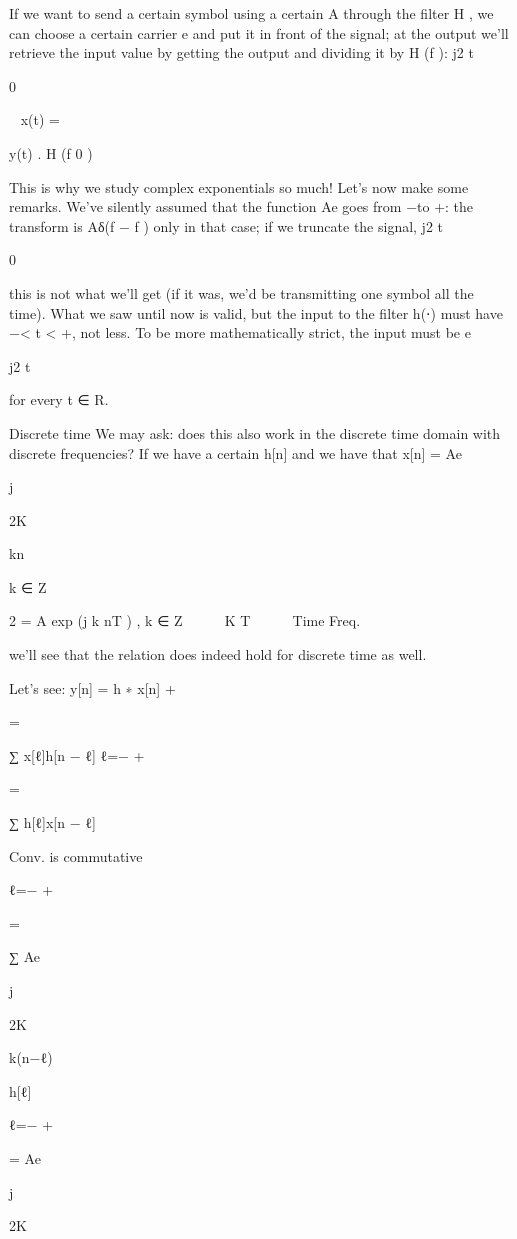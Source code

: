 {If we want to send a certain symbol using a certain A through the filter H , we can choose a certain carrier e and put it in front of the signal; at the output we'll retrieve the input value by getting the output and dividing it by H (f ):
j2 t

0

~
x(t) =

y(t)
.
H (f 0 )

This is why we study complex exponentials so much!
Let's now make some remarks. We've silently assumed that the function Ae goes from −\infty to +\infty: the transform is Aδ(f − f ) only in that case; if we truncate the signal,
j2 t

0

this is not what we'll get (if it was, we'd be transmitting one symbol all the time).
What we saw until now is valid, but the input to the filter h(⋅) must have −\infty < t < +\infty,
not less. To be more mathematically strict, the input must be e

j2 t

for every t ∈ R.

Discrete time We may ask: does this also work in the discrete time domain with discrete frequencies?
If we have a certain h[n] and we have that x[n] = Ae

j

2\pi K

kn

k ∈ Z

2
= A exp (j k nT ) ,
k ∈ Z



K T


 Time Freq.

we'll see that the relation does indeed hold for discrete time as well.

Let's see:
y[n] = h ∗ x[n]
+\infty

=

∑ x[ℓ]h[n − ℓ]
ℓ=−\infty
+\infty

=

∑ h[ℓ]x[n − ℓ]

Conv. is commutative

ℓ=−\infty
+\infty

=

∑ Ae

j

2\pi K

k(n−ℓ)

h[ℓ]

ℓ=−\infty
+\infty

= Ae

j

2\pi K

}
